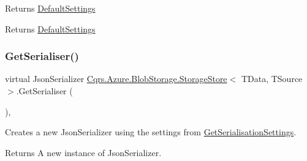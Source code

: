 Returns \hyperlink{classCqrs_1_1Azure_1_1BlobStorage_1_1StorageStore_ac5c27123fd0bf4d926a4865e2d6b0bdd_ac5c27123fd0bf4d926a4865e2d6b0bdd}{Default\+Settings} 

\begin{DoxyReturn}{Returns}
\hyperlink{classCqrs_1_1Azure_1_1BlobStorage_1_1StorageStore_ac5c27123fd0bf4d926a4865e2d6b0bdd_ac5c27123fd0bf4d926a4865e2d6b0bdd}{Default\+Settings}
\end{DoxyReturn}
\mbox{\label{classCqrs_1_1Azure_1_1BlobStorage_1_1StorageStore_acca953271229a19433db9c38c85b5b9e_acca953271229a19433db9c38c85b5b9e}} 
\subsubsection{\texorpdfstring{Get\+Serialiser()}{GetSerialiser()}}
{\footnotesize\ttfamily virtual Json\+Serializer \hyperlink{classCqrs_1_1Azure_1_1BlobStorage_1_1StorageStore}{Cqrs.\+Azure.\+Blob\+Storage.\+Storage\+Store}$<$ T\+Data, T\+Source $>$.Get\+Serialiser (\begin{DoxyParamCaption}{ }\end{DoxyParamCaption})\hspace{0.3cm}{\ttfamily [protected]}, {\ttfamily [virtual]}}



Creates a new Json\+Serializer using the settings from \hyperlink{classCqrs_1_1Azure_1_1BlobStorage_1_1StorageStore_a9ded88f1b48cf61b3be826fb0997adfb_a9ded88f1b48cf61b3be826fb0997adfb}{Get\+Serialisation\+Settings}. 

\begin{DoxyReturn}{Returns}
A new instance of Json\+Serializer.
\end{DoxyReturn}
\mbox{\label{classCqrs_1_1Azure_1_1BlobStorage_1_1StorageStore_a8d16603267a768190f2c49ca3d1c439e_a8d16603267a768190f2c49ca3d1c439e}} 
